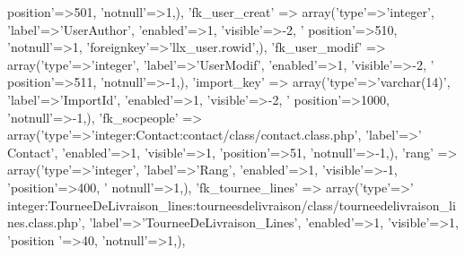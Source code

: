 \begin{DoxyCode}
{      position'}=>501, \textcolor{stringliteral}{'notnull'}=>1,),
        \textcolor{stringliteral}{'fk\_user\_creat'} => array(\textcolor{stringliteral}{'type'}=>\textcolor{stringliteral}{'integer'}, \textcolor{stringliteral}{'label'}=>\textcolor{stringliteral}{'UserAuthor'}, \textcolor{stringliteral}{'enabled'}=>1, \textcolor{stringliteral}{'visible'}=>-2, \textcolor{stringliteral}{'
      position'}=>510, \textcolor{stringliteral}{'notnull'}=>1, \textcolor{stringliteral}{'foreignkey'}=>\textcolor{stringliteral}{'llx\_user.rowid'},),
        \textcolor{stringliteral}{'fk\_user\_modif'} => array(\textcolor{stringliteral}{'type'}=>\textcolor{stringliteral}{'integer'}, \textcolor{stringliteral}{'label'}=>\textcolor{stringliteral}{'UserModif'}, \textcolor{stringliteral}{'enabled'}=>1, \textcolor{stringliteral}{'visible'}=>-2, \textcolor{stringliteral}{'
      position'}=>511, \textcolor{stringliteral}{'notnull'}=>-1,),
        \textcolor{stringliteral}{'import\_key'} => array(\textcolor{stringliteral}{'type'}=>\textcolor{stringliteral}{'varchar(14)'}, \textcolor{stringliteral}{'label'}=>\textcolor{stringliteral}{'ImportId'}, \textcolor{stringliteral}{'enabled'}=>1, \textcolor{stringliteral}{'visible'}=>-2, \textcolor{stringliteral}{'
      position'}=>1000, \textcolor{stringliteral}{'notnull'}=>-1,),
        \textcolor{stringliteral}{'fk\_socpeople'} => array(\textcolor{stringliteral}{'type'}=>\textcolor{stringliteral}{'integer:Contact:contact/class/contact.class.php'}, \textcolor{stringliteral}{'label'}=>\textcolor{stringliteral}{'
      Contact'}, \textcolor{stringliteral}{'enabled'}=>1, \textcolor{stringliteral}{'visible'}=>1, \textcolor{stringliteral}{'position'}=>51, \textcolor{stringliteral}{'notnull'}=>-1,),
        \textcolor{stringliteral}{'rang'} => array(\textcolor{stringliteral}{'type'}=>\textcolor{stringliteral}{'integer'}, \textcolor{stringliteral}{'label'}=>\textcolor{stringliteral}{'Rang'}, \textcolor{stringliteral}{'enabled'}=>1, \textcolor{stringliteral}{'visible'}=>-1, \textcolor{stringliteral}{'position'}=>400, \textcolor{stringliteral}{'
      notnull'}=>1,),
        \textcolor{stringliteral}{'fk\_tournee\_lines'} => array(\textcolor{stringliteral}{'type'}=>\textcolor{stringliteral}{'
      integer:TourneeDeLivraison\_lines:tourneesdelivraison/class/tourneedelivraison\_lines.class.php'}, \textcolor{stringliteral}{'label'}=>\textcolor{stringliteral}{'TourneeDeLivraison\_Lines'}, \textcolor{stringliteral}{'enabled'}=>1, \textcolor{stringliteral}{'visible'}=>1, \textcolor{stringliteral}{'position
      '}=>40, \textcolor{stringliteral}{'notnull'}=>1,),

\end{DoxyCode}
